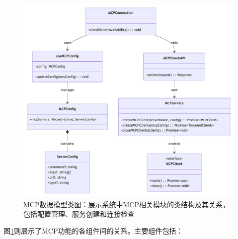 \begin{figure}[H]
  \centering
  \includegraphics[width=\textwidth]{figures/mcp_class.pdf}
  \caption{MCP数据模型类图：展示系统中MCP相关模块的类结构及其关系，包括配置管理、服务创建和连接检查}
  \label{fig:mcp_class}
\end{figure}

图\ref{fig:mcp_class}则展示了MCP功能的各组件间的关系。主要组件包括：

